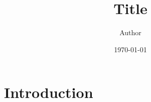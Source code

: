 \documentclass[12pt]{article}
\title{Title}
\author{Author}
\date{\today}
\begin{document}
\maketitle
{}
\newpage
{}

\section*{Introduction}



\end{document}
